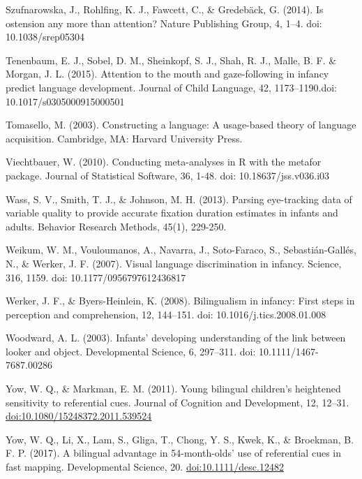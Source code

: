 \documentclass[,man,floatsintext]{apa6}
\begin{document}
Szufnarowska, J., Rohlfing, K. J., Fawcett, C., \& Gredebäck, G. (2014). Is ostension any more than attention? Nature Publishing Group, 4, 1--4. doi: 10.1038/srep05304

Tenenbaum, E. J., Sobel, D. M., Sheinkopf, S. J., Shah, R. J., Malle, B. F. \& Morgan, J. L. (2015). Attention to the mouth and gaze-following in infancy predict language development. Journal of Child Language, 42, 1173--1190.doi: 10.1017/s0305000915000501

Tomasello, M. (2003). Constructing a language: A usage-based theory of language acquisition. Cambridge, MA: Harvard University Press.

Viechtbauer, W. (2010). Conducting meta-analyses in R with the metafor package. Journal of Statistical Software, 36, 1-48. doi: 10.18637/jss.v036.i03

Wass, S. V., Smith, T. J., \& Johnson, M. H. (2013). Parsing eye-tracking data of variable quality to provide accurate fixation duration estimates in infants and adults. Behavior Research Methods, 45(1), 229-250.

Weikum, W. M., Vouloumanos, A., Navarra, J., Soto-Faraco, S., Sebastián-Gallés, N., \& Werker, J. F. (2007). Visual language discrimination in infancy. Science, 316, 1159. doi: 10.1177/0956797612436817

Werker, J. F., \& Byers-Heinlein, K. (2008). Bilingualism in infancy: First steps in perception and comprehension, 12, 144--151. doi: 10.1016/j.tics.2008.01.008

Woodward, A. L. (2003). Infants' developing understanding of the link between looker and object. Developmental Science, 6, 297--311. doi: 10.1111/1467-7687.00286

Yow, W. Q., \& Markman, E. M. (2011). Young bilingual children's heightened sensitivity to referential cues. Journal of Cognition and Development, 12, 12--31. \url{doi:10.1080/15248372.2011.539524}

Yow, W. Q., Li, X., Lam, S., Gliga, T., Chong, Y. S., Kwek, K., \& Broekman, B. F. P. (2017). A bilingual advantage in 54-month-olds' use of referential cues in fast mapping. Developmental Science, 20. \url{doi:10.1111/desc.12482}

\begingroup
\setlength{\parindent}{-0.5in}
\setlength{\leftskip}{0.5in}

\hypertarget{refs}{}

\endgroup
\end{document}
